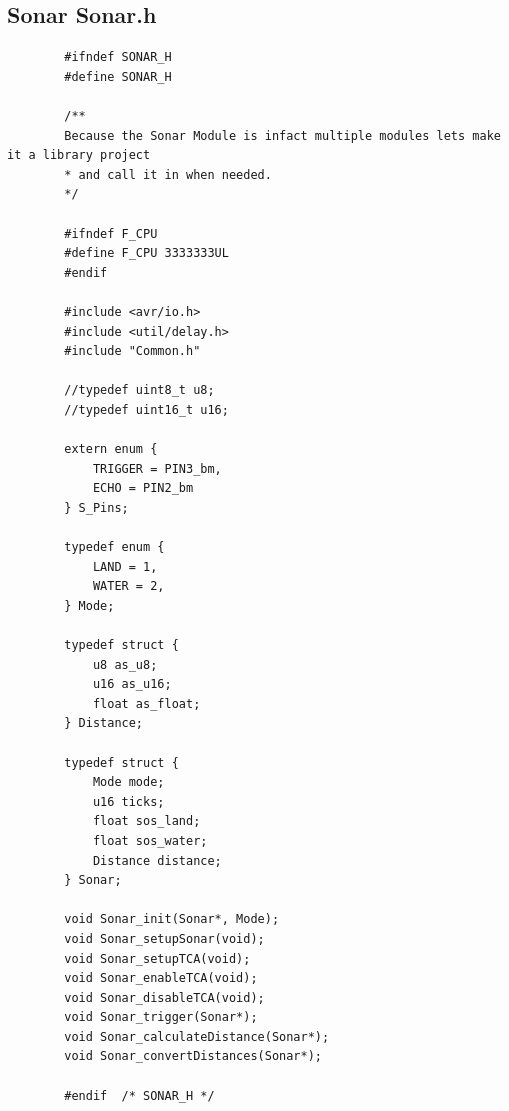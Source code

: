 \documentclass[11pt,a4paper,titlepage]{report}
\begin{document}
	\subsection{Sonar Sonar.h}\label{appendix:final_code_sonar_h}
	\begin{lstlisting}
		#ifndef SONAR_H
		#define	SONAR_H
		
		/**
		Because the Sonar Module is infact multiple modules lets make it a library project 
		* and call it in when needed. 
		*/
		
		#ifndef F_CPU
		#define F_CPU 3333333UL
		#endif
		
		#include <avr/io.h>
		#include <util/delay.h>
		#include "Common.h"
		
		//typedef uint8_t u8;
		//typedef uint16_t u16;
		
		extern enum {
			TRIGGER = PIN3_bm,
			ECHO = PIN2_bm
		} S_Pins;
		
		typedef enum {
			LAND = 1,
			WATER = 2,
		} Mode;
		
		typedef struct {
			u8 as_u8;
			u16 as_u16;
			float as_float;
		} Distance;
		
		typedef struct {
			Mode mode;
			u16 ticks;
			float sos_land;
			float sos_water;
			Distance distance;
		} Sonar;
		
		void Sonar_init(Sonar*, Mode);
		void Sonar_setupSonar(void);
		void Sonar_setupTCA(void);
		void Sonar_enableTCA(void);
		void Sonar_disableTCA(void);
		void Sonar_trigger(Sonar*);
		void Sonar_calculateDistance(Sonar*);
		void Sonar_convertDistances(Sonar*);
		
		#endif	/* SONAR_H */
	\end{lstlisting}
	
\end{document}
